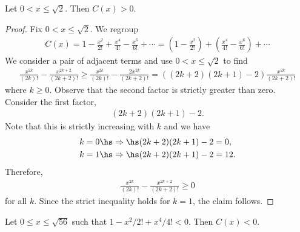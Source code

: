 \documentclass{article}
\begin{document}
\begin{claim*}
	Let $0<x\leq \sqrt{2}$. Then $C(x)>0$.
\end{claim*}
\begin{proof}
	Fix $0<x\leq\sqrt{2}$. We regroup
	\begin{align*}
		C(x) = 1 - \frac{x^2}{2!} + \frac{x^4}{4!} - \frac{x^6}{6!} + \cdots
		= \left(1 - \frac{x^2}{2!}\right) + \left(\frac{x^4}{4!} - \frac{x^6}{6!}\right) + \cdots
	\end{align*}
	We consider a pair of adjacent terms and use $0<x\leq\sqrt{2}$ to find
	\begin{align*}
		\frac{x^{2k}}{(2k)!} - \frac{x^{2k+2}}{(2k+2)!}
		\geq \frac{x^{2k}}{(2k)!}-\frac{2x^{2k}}{(2k+2)!}
		= ((2k+2)(2k+1)-2)\frac{x^{2k}}{(2k+2)!}
	\end{align*}
	where $k\geq 0$.
	Observe that the second factor is strictly greater than zero. Consider the first factor,
	\begin{align*}
		(2k+2)(2k+1) - 2.
	\end{align*}
	Note that this is strictly increasing with $k$ and we have
	\begin{align*}
		k=0 \hs & \Rightarrow\hs (2k+2)(2k+1) - 2 = 0,  \\
		k=1 \hs & \Rightarrow\hs (2k+2)(2k+1) - 2 = 12. \\
	\end{align*}
	Therefore,
	\begin{align*}
		\frac{x^{2k}}{(2k)!} - \frac{x^{2k+2}}{(2k+2)!} \geq 0
	\end{align*}
	for all $k$. Since the strict inequality holds for $k=1$, the claim follows.
\end{proof}
\begin{claim*}
	Let $0\leq x\leq \sqrt{56}$ such that $1-x^2/2!+x^4/4!<0$. Then $C(x)<0$.
\end{claim*}
\end{document}
